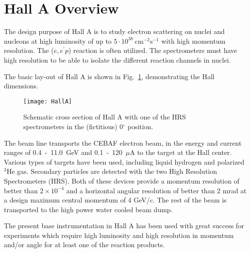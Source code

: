 \section[Hall A Overview]{Hall A Overview}
\label{sec:intro-halla-overview}

The design purpose of Hall A is to study electron scattering 
on nuclei and nucleons at high luminosity
of up to $5\cdot{}10^{38}~\mathrm{cm^{-2}s^{-1}}$ with high momentum
resolution. The ($e,e^{\prime}p$) reaction is often utilized.
The spectrometers must have high resolution 
to be able to isolate the different reaction channels in nuclei.

The basic lay-out of Hall A is shown in Fig.~\ref{fig:HallA-side},
demonstrating the Hall dimensions.

\begin{figure}[htb]
 \begin{center}
    \texttt{[image: HallA]}
 \end{center}
\caption[Hall A schematic cross section]%
{Schematic cross section of Hall A with one of the HRS 
spectrometers in the (fictitious) 0$^\circ$ position. 
}
\label{fig:HallA-side}
\end{figure}

The beam line transports the CEBAF electron beam, in the energy 
and current ranges of 0.4~-~11.0~GeV and 0.1~-~120~$\mu$A to the target
at the Hall center. Various types of targets have been used, including
liquid hydrogen and polarized $^3$He gas. Secondary particles
are detected with the  
two High Resolution Spectrometers (HRS). Both of these devices  
provide a momentum resolution of better than $2\times 10^{-4}$ and a horizontal angular 
resolution of better than 2 mrad at a design maximum central momentum 
of 4 GeV/$c$. The rest of the beam is transported to the high power
water cooled beam dump.

The present base instrumentation in Hall A has been used with great 
success for experiments which require high luminosity and high resolution 
in momentum and/or angle for at least one of the reaction products.
	
